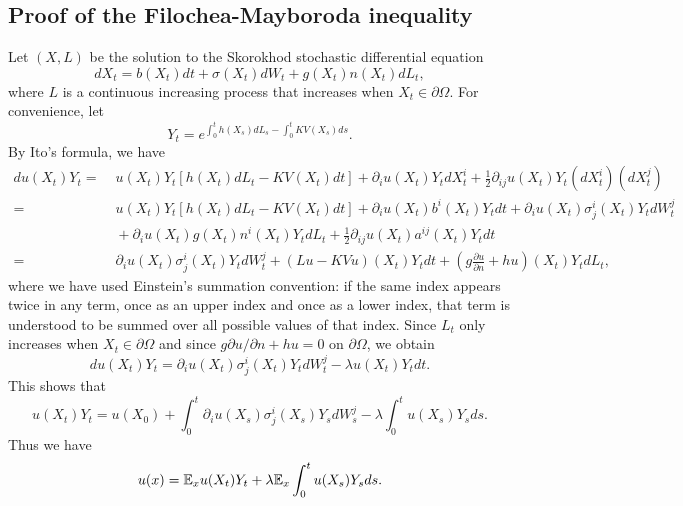 \documentclass[a4paper,11pt]{article}
\begin{document}
\begin{appendices}

\section{Proof of the Filochea-Mayboroda inequality}\label{AppendixA}

Let $(X, L)$ be the solution to the Skorokhod stochastic differential equation
\begin{equation*}
d X_t = b(X_t) dt + \sigma(X_t) d W_t + g(X_t) n(X_t) d L_t,
\end{equation*}
where $L$ is a continuous increasing process that increases when $X_t \in \partial \Omega$. For convenience, let
\begin{equation*}
Y_t = e^{\int_{0}^{t} h(X_s) d L_s - \int_{0}^{t} K V(X_s) ds}.
\end{equation*}
By Ito's formula, we have
\begin{equation*}
\begin{split}
du(X_t)Y_t =&\; u(X_t)Y_t[h(X_t)dL_t-KV(X_t)dt]
+\partial_iu(X_t)Y_tdX^i_t+\frac{1}{2}\partial_{ij}u(X_t)Y_t(dX^i_t)(dX^j_t)\\
=&\; u(X_t)Y_t[h(X_t)dL_t-KV(X_t)dt]+\partial_iu(X_t)b^i(X_t)Y_tdt
+\partial_iu(X_t)\sigma^i_j(X_t)Y_tdW^j_t\\
&\;+\partial_iu(X_t)g(X_t)n^i(X_t)Y_tdL_t+\frac{1}{2}\partial_{ij}u(X_t)a^{ij}(X_t)Y_tdt\\
=&\; \partial_iu(X_t)\sigma^i_j(X_t)Y_tdW^j_t+(Lu-KVu)(X_t)Y_tdt
+\left(g\frac{\partial u}{\partial n}+hu\right)(X_t)Y_tdL_t,
\end{split}
\end{equation*}
where we have used Einstein's summation convention: if the same index appears twice in any term, once as an upper index and once as a lower index, that term is understood to be summed over all possible values of that index. Since $L_t$ only increases when $X_t\in\partial\Omega$ and since $g\partial u/\partial n+hu = 0$ on $\partial\Omega$, we obtain
\begin{equation*}
du(X_t)Y_t = \partial_iu(X_t)\sigma^i_j(X_t)Y_tdW^j_t-\lambda u(X_t)Y_tdt.
\end{equation*}
This shows that
\begin{equation*}
u(X_t)Y_t = u(X_0)+\int_0^t\partial_iu(X_s)\sigma^i_j(X_s)Y_sdW^j_s-\lambda\int_0^tu(X_s)Y_sds.
\end{equation*}
Thus we have
\begin{equation*}
u(x) = \Enum_xu(X_t)Y_t+\lambda\Enum_x\int_0^t u(X_s)Y_sds.

\end{equation*}
\end{appendices}
\end{document}
